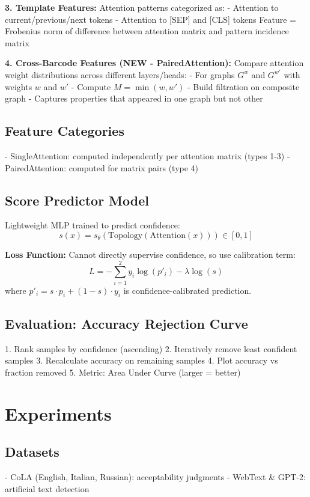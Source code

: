 \textbf{3. Template Features:}
Attention patterns categorized as:
- Attention to current/previous/next tokens
- Attention to [SEP] and [CLS] tokens
Feature = Frobenius norm of difference between attention matrix and pattern incidence matrix

\textbf{4. Cross-Barcode Features (NEW - PairedAttention):}
Compare attention weight distributions across different layers/heads:
- For graphs $G^w$ and $G^{w'}$ with weights $w$ and $w'$
- Compute $M = \min(w, w')$
- Build filtration on composite graph
- Captures properties that appeared in one graph but not other

\subsection{Feature Categories}
- SingleAttention: computed independently per attention matrix (types 1-3)
- PairedAttention: computed for matrix pairs (type 4)

\subsection{Score Predictor Model}
Lightweight MLP trained to predict confidence:
\begin{equation}
s(x) = s_\theta(\text{Topology}(\text{Attention}(x))) \in [0, 1]
\end{equation}

\textbf{Loss Function:}
Cannot directly supervise confidence, so use calibration term:
\begin{equation}
L = -\sum_{i=1}^{2} y_i \log(p'_i) - \lambda \log(s)
\end{equation}
where $p'_i = s \cdot p_i + (1-s) \cdot y_i$ is confidence-calibrated prediction.

\subsection{Evaluation: Accuracy Rejection Curve}
1. Rank samples by confidence (ascending)
2. Iteratively remove least confident samples
3. Recalculate accuracy on remaining samples
4. Plot accuracy vs fraction removed
5. Metric: Area Under Curve (larger = better)

\section{Experiments}

\subsection{Datasets}
- CoLA (English, Italian, Russian): acceptability judgments
- WebText & GPT-2: artificial text detection

